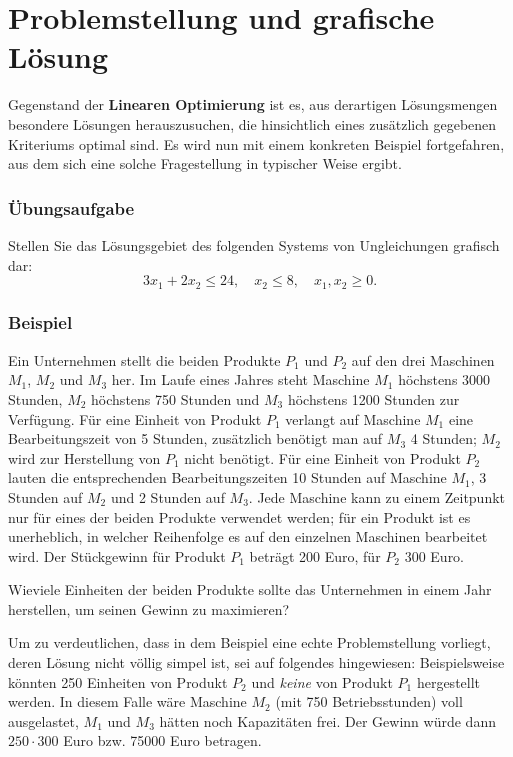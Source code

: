\section{Problemstellung und grafische Lösung}


Gegenstand der \textbf{Linearen Optimierung} ist es, aus derartigen Lösungsmengen besondere Lösungen herauszusuchen, die hinsichtlich eines zusätzlich gegebenen Kriteriums optimal sind. Es wird nun mit einem konkreten Beispiel fortgefahren, aus dem sich eine solche Fragestellung in typischer Weise ergibt.

\subsubsection{Übungsaufgabe}

\begin{graukasten}
  Stellen Sie das Lösungsgebiet des folgenden Systems von Ungleichungen grafisch dar:
  \[ 3x_1 + 2x_2 \leq 24, \quad x_2 \leq 8, \quad x_1, x_2 \geq 0 . \]
\end{graukasten}

\subsubsection{Beispiel}

Ein Unternehmen stellt die beiden Produkte $P_1$ und $P_2$ auf den drei Maschinen $M_1$, $M_2$ und $M_3$ her. Im Laufe eines Jahres steht Maschine $M_1$ höchstens 3000 Stunden, $M_2$ höchstens 750 Stunden und $M_3$ höchstens 1200 Stunden zur Verfügung. Für eine Einheit von Produkt $P_1$ verlangt auf Maschine $M_1$ eine Bearbeitungszeit von 5 Stunden, zusätzlich benötigt man auf $M_3$ 4 Stunden; $M_2$ wird zur Herstellung von $P_1$ nicht benötigt. Für eine Einheit von Produkt $P_2$ lauten die entsprechenden Bearbeitungszeiten 10 Stunden auf Maschine $M_1$, 3 Stunden auf $M_2$ und 2 Stunden auf $M_3$. Jede Maschine kann zu einem Zeitpunkt nur für eines der beiden Produkte verwendet werden; für ein Produkt ist es unerheblich, in welcher Reihenfolge es auf den einzelnen Maschinen bearbeitet wird. Der Stückgewinn für Produkt $P_1$ beträgt 200 Euro, für $P_2$ 300 Euro.

Wieviele Einheiten der beiden Produkte sollte das Unternehmen in einem Jahr herstellen, um seinen Gewinn zu maximieren?\beispielende

Um zu verdeutlichen, dass in dem Beispiel eine echte Problemstellung vorliegt, deren Lösung nicht völlig simpel ist, sei auf folgendes hingewiesen: Beispielsweise könnten 250 Einheiten von Produkt $P_2$ und \emph{keine} von Produkt $P_1$ hergestellt werden. In diesem Falle wäre Maschine $M_2$ (mit 750 Betriebsstunden) voll ausgelastet, $M_1$ und $M_3$ hätten noch Kapazitäten frei. Der Gewinn würde dann $250 \cdot 300$ Euro bzw. 75000 Euro betragen.

